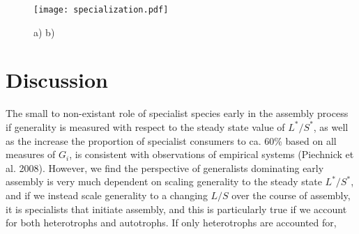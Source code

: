 \documentclass[twocolumn,preprintnumbers,amsmath,amssymb,superscriptaddress]{revtex4}
\begin{document}
\begin{figure}
\centering
\texttt{[image: specialization.pdf]}
\caption{
a)
b)
}
\label{fig:spec}
\end{figure} 







\section*{Discussion}
The small to non-existant role of specialist species early in the assembly process if generality is measured with respect to the steady state value of $L^*/S^*$, as well as the increase the proportion of specialist consumers to ca. 60\% based on all measures of $G_i$, is consistent with observations of empirical systems (Piechnick et al. 2008).
However, we find the perspective of generalists dominating early assembly is very much dependent on scaling generality to the steady state $L^*/S^*$, and if we instead scale generality to a changing $L/S$ over the course of assembly, it is specialists that initiate assembly, and this is particularly true if we account for both heterotrophs and autotrophs.
If only heterotrophs are accounted for, 
\end{document}
